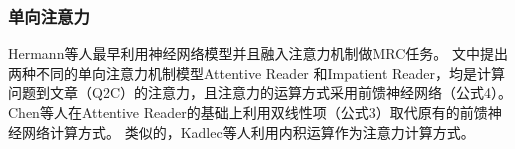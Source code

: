 \subsubsection{单向注意力}
Hermann等人最早利用神经网络模型并且融入注意力机制做MRC任务。
文中提出两种不同的单向注意力机制模型Attentive Reader
和Impatient Reader，均是计算问题到文章（Q2C）的注意力，且注意力的运算方式采用前馈神经网络（公式4）。
Chen等人在Attentive Reader的基础上利用双线性项（公式3）取代原有的前馈神经网络计算方式。
类似的，Kadlec等人利用内积运算作为注意力计算方式。
%
